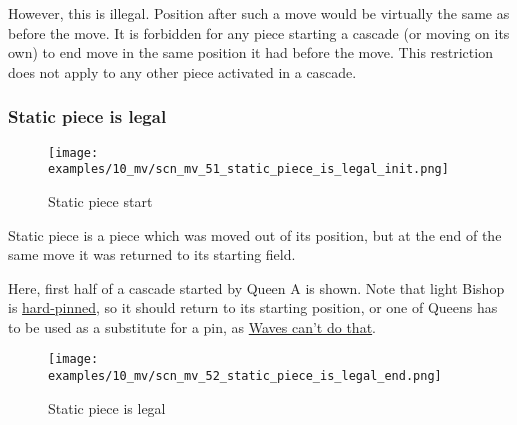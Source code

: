 However, this is illegal. Position after such a move would be virtually the same
as before the move. It is forbidden for any piece starting a cascade (or moving
on its own) to end move in the same position it had before the move. This
restriction does not apply to any other piece activated in a cascade.

\clearpage %

\subsubsection*{Static piece is legal}
\label{sec:Miranda's veil/Wave/Cascading Waves/Static piece is legal}

\vspace*{-1.4\baselineskip}
\noindent
\begin{figure}[!h]
\texttt{[image: examples/10\_mv/scn\_mv\_51\_static\_piece\_is\_legal\_init.png]}
\vspace*{-1.3\baselineskip}
\caption{Static piece start}
\label{fig:scn_mv_51_static_piece_is_legal_init}
\end{figure}

\vspace*{-0.4\baselineskip}
Static piece is a piece which was moved out of its position, but at the end of the
same move it was returned to its starting field.

Here, first half of a cascade started by Queen A is shown. Note that light Bishop
is \href{https://en.wikipedia.org/wiki/Pin_(chess)#Absolute_pin}{hard-pinned}, so
it should return to its starting position, or one of Queens has to be used as a
substitute for a pin, as
\hyperref[fig:scn_mv_41_pinned_piece_cascaded_init]{Waves can't do that}.

\clearpage %

\vspace*{-2.1\baselineskip}
\noindent
\begin{figure}[!h]
\texttt{[image: examples/10\_mv/scn\_mv\_52\_static\_piece\_is\_legal\_end.png]}
\vspace*{-1.3\baselineskip}
\caption{Static piece is legal}
\label{fig:scn_mv_52_static_piece_is_legal_end}
\end{figure}

